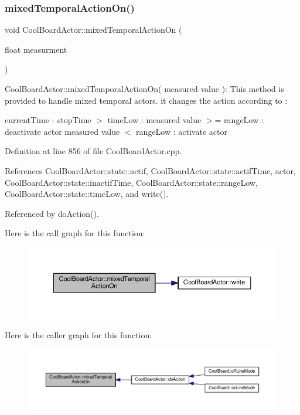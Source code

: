\subsubsection{\texorpdfstring{mixed\+Temporal\+Action\+On()}{mixedTemporalActionOn()}}
{\footnotesize\ttfamily void Cool\+Board\+Actor\+::mixed\+Temporal\+Action\+On (\begin{DoxyParamCaption}\item[{float}]{measurment }\end{DoxyParamCaption})}

Cool\+Board\+Actor\+::mixed\+Temporal\+Action\+On( measured value )\+: This method is provided to handle mixed temporal actors. it changes the action according to \+:

current\+Time -\/ stop\+Time $>$ time\+Low \+: measured value $>$= range\+Low \+: deactivate actor measured value $<$ range\+Low \+: activate actor 

Definition at line 856 of file Cool\+Board\+Actor.\+cpp.



References Cool\+Board\+Actor\+::state\+::actif, Cool\+Board\+Actor\+::state\+::actif\+Time, actor, Cool\+Board\+Actor\+::state\+::inactif\+Time, Cool\+Board\+Actor\+::state\+::range\+Low, Cool\+Board\+Actor\+::state\+::time\+Low, and write().



Referenced by do\+Action().

Here is the call graph for this function\+:\nopagebreak
\begin{figure}[H]
\begin{center}
\leavevmode
\includegraphics[width=350pt]{dc/d69/class_cool_board_actor_a216aa7a0cfd1f31d0025cc91c2ecd5dd_cgraph}
\end{center}
\end{figure}
Here is the caller graph for this function\+:\nopagebreak
\begin{figure}[H]
\begin{center}
\leavevmode
\includegraphics[width=350pt]{dc/d69/class_cool_board_actor_a216aa7a0cfd1f31d0025cc91c2ecd5dd_icgraph}
\end{center}
\end{figure}
\mbox{\label{class_cool_board_actor_adf3b4e15b9d73681082112adf8ef95cb}} 
